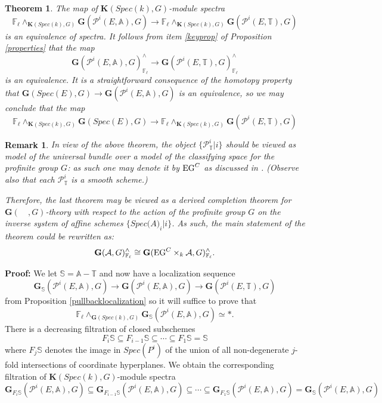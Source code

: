 \documentclass[11pt]{article}
\newcommand\mb{\mathbb}
\newcommand\mc{\mathcal}
\def \bG{\mathbf G}
\def \bK{\mathbf K}
\newcommand\mfk{\mathbf G}
\newtheorem{Theorem}{Theorem}[section]
\newtheorem{Remark}{Remark}[section]
\begin{document}
\begin{Theorem}\label{mainfinal}
    The map of $\bK(Spec(k), G)$-module spectra 
    $$ \mb{F}_{\ell} \wedge _{\bK (Spec(k),G)} \mfk (\mc{P}^i(E,\mb{A}),G) \rightarrow \mb{F}_{\ell} \wedge _{\bK (Spec(k),G)} \mfk (\mc{P}^i(E,\mb{T}),G)
    $$
    is an equivalence of spectra.  It follows from item \ref{keyprop} of Proposition \ref{properties} that the map 
    $$\mfk (\mc{P}^i(E,\mb{A}),G)^{\wedge}_{\mb{F}_{\ell}} \rightarrow  \mfk (\mc{P}^i(E,\mb{T}),G)^{\wedge}_{\mb{F}_{\ell}}
    $$
    is an equivalence.  It is a straightforward consequence of the homotopy property that $\mfk(Spec(E),G) \rightarrow \mfk (\mc{P}^i(E,\mb{A}),G)$ is an equivalence, so we may conclude that the map 
    $$ \mb{F}_{\ell} \wedge _{\bK (Spec(k),G)} \mfk (Spec(E),G) \rightarrow \mb{F}_{\ell} \wedge _{\bK (Spec(k),G)} \mfk (\mc{P}^i (E,\mb{T}),G)
    $$
\end{Theorem}


\begin{Remark} \label{rem.fundfiltration}
In view of the above theorem, the object $\{\mc{P}^i _{\mc{\mb{T}}}|i\}$ should be viewed as
model of the universal bundle over a model of the classifying space for the profinite group $G$: as such one may denote
it by ${\rm EG}^C$ as discussed in \cite[section 4(ii)]{royg4}. (Observe also that each $\mc{P}^i _{\mc{\mb{T}}}$ is a smooth scheme.)

 Therefore, the last theorem may be viewed as a derived completion theorem for $\bG(\quad, G)$-theory
with respect to the action of the profinite group $G$ on the inverse system of
affine schemes $\{Spec\mc(A)_i|i\}$. As such, the main statement of the theorem could be rewritten as:
\[\mfk(\mc{A}, G)^{\wedge}_{\mb{F}_{\ell}} \cong \mfk({\rm EG}^C\times_{k} \mc{A}, G) ^{\wedge}_{\mb{F}_{\ell}}. \]
\end{Remark}
{\bf Proof:} 
We let $\mb{S} = \mb{A}- \mb{T}$ and now have a localization sequence   
\begin{equation}  \mfk _{\mb{S}} (\mc{P}^i(E,\mb{A}), G) \rightarrow \mfk (\mc{P}^i(E, \mb{A}), G )  \rightarrow \mfk (\mc{P}^i(E, \mb{T}),  G)
\end{equation} from Proposition \ref{pullbacklocalization}
so it will suffice to prove that  
\begin{equation} \label{reductionone} \mb{F}_{\ell} \wedge _{\mfk(Spec(k), G)}\mfk _{\mb{S}}(\mc{P}^i(E,\mb{A}), G ) \simeq * .\end{equation} There is a decreasing filtration of closed subschemes 
\begin{equation}\label{filtration}  F_i \mb{S}\subseteq F_{i-1} \mb{S}\subseteq \cdots \subseteq F_1\mb{S} = \mb{S} \end{equation}
where $F_j \mb{S}$ denotes the  image in $Spec(P^i)$ of the union of all non-degenerate $j$-fold intersections of coordinate hyperplanes.  We obtain the corresponding filtration of $\bK(Spec(k), G)$-module spectra 
\begin{equation}\label{firstsequence} \mfk_{F_i \mb{S}}(\mc{P}^i(E,\mb{A}), G) \subseteq \mfk_{F_{i-1} \mb{S}}(\mc{P}^i(E,\mb{A}), G )\subseteq \cdots \subseteq \mfk_{F_1 \mb{S}}(\mc{P}^i(E,\mb{A}), G) = \mfk_{\mb{S}}(\mc{P}^i(E,\mb{A}), G) \end{equation}
\end{document}
